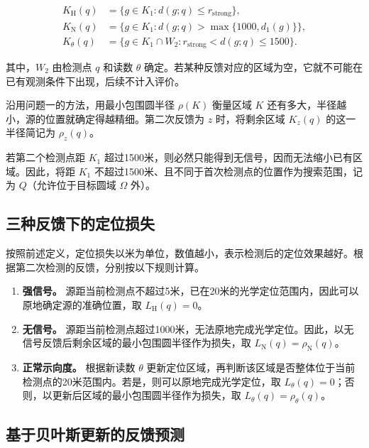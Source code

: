 \documentclass[UTF8,a4paper,zihao=-4,fontset=none]{ctexart}
\begin{document}
\begin{equation}
\begin{aligned}
K_{\mathrm H}(q)&=\{g\in K_1:d(g;q)\le r_{\mathrm{strong}}\},\\
K_{\mathrm N}(q)&=\{g\in K_1:d(g;q)>\max\{1000,d_1(g)\}\},\\
K_\theta(q)&=\{g\in K_1\cap W_2:r_{\mathrm{strong}}<d(g;q)\le1500\}.
\end{aligned}
\label{eq:q2-pair-regions}
\end{equation}

其中，\(W_2\) 由检测点 \(q\) 和读数 \(\theta\) 确定。若某种反馈对应的区域为空，它就不可能在已有观测条件下出现，后续不计入评价。

沿用问题一的方法，用最小包围圆半径 \(\rho(K)\) 衡量区域 \(K\) 还有多大，半径越小，源的位置就确定得越精细。第二次反馈为 \(z\) 时，将剩余区域 \(K_z(q)\) 的这一半径简记为 \(\rho_z(q)\)。

若第二个检测点距 \(K_1\) 超过1500米，则必然只能得到无信号，因而无法缩小已有区域。因此，将距 \(K_1\) 不超过1500米、且不同于首次检测点的位置作为搜索范围，记为 \(Q\)（允许位于目标圆域 \(\Omega\) 外）。

\subsection{三种反馈下的定位损失}

按照前述定义，定位损失以米为单位，数值越小，表示检测后的定位效果越好。根据第二次检测的反馈，分别按以下规则计算。

\begin{enumerate}[label=(\arabic*),leftmargin=2.2em]
  \item \textbf{强信号。} 源距当前检测点不超过5米，已在20米的光学定位范围内，因此可以原地确定源的准确位置，取 \(L_{\mathrm H}(q)=0\)。
  \item \textbf{无信号。} 源距当前检测点超过1000米，无法原地完成光学定位。因此，以无信号反馈后剩余区域的最小包围圆半径作为损失，取 \(L_{\mathrm N}(q)=\rho_{\mathrm N}(q)\)。
  \item \textbf{正常示向度。} 根据新读数 \(\theta\) 更新定位区域，再判断该区域是否整体位于当前检测点的20米范围内。若是，则可以原地完成光学定位，取 \(L_\theta(q)=0\)；否则，以更新后区域的最小包围圆半径作为损失，取 \(L_\theta(q)=\rho_\theta(q)\)。
\end{enumerate}

\subsection{基于贝叶斯更新的反馈预测}
\end{document}
